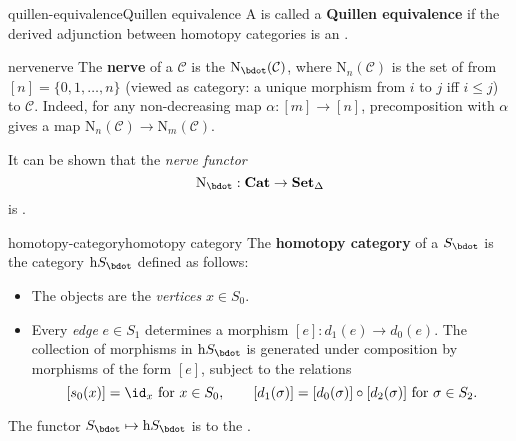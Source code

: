 \begin{topic}{quillen-equivalence}{Quillen equivalence}
    A  is called a \textbf{Quillen equivalence} if the derived adjunction between homotopy categories is an .
\end{topic}



  


\begin{topic}{nerve}{nerve}
    The \textbf{nerve} of a  $\mathcal{C}$ is the  $\text{N}_\bdot(\mathcal{C})$, where $\text{N}_n(\mathcal{C})$ is the set of  from $[n] = \{ 0, 1, \ldots, n \}$ (viewed as category: a unique morphism from $i$ to $j$ iff $i \le j$) to $\mathcal{C}$.
    Indeed, for any non-decreasing map $\alpha : [m] \to [n]$, precomposition with $\alpha$ gives a map $\text{N}_n(\mathcal{C}) \to \text{N}_m(\mathcal{C})$.
    
    It can be shown that the \textit{nerve functor}
    \[ \text{N}_\bdot : \textbf{Cat} \to \textbf{Set}_\Delta \]
    is  .
\end{topic}

\begin{topic}{homotopy-category}{homotopy category}
    The \textbf{homotopy category} of a  $S_\bdot$ is the category $\text{h}S_\bdot$ defined as follows:
    \begin{itemize}
        \item The objects are the \textit{vertices} $x \in S_0$.
        \item Every \textit{edge} $e \in S_1$ determines a morphism $[e] : d_1(e) \to d_0(e)$. The collection of morphisms in $\text{h}S_\bdot$ is generated under composition by morphisms of the form $[e]$, subject to the relations
        \[ [s_0(x)] = \id_x \text{ for } x \in S_0, \qquad [d_1(\sigma)] = [d_0(\sigma)] \circ [d_2(\sigma)] \text{ for } \sigma \in S_2 . \]
    \end{itemize}
    
    The functor $S_\bdot \mapsto \text{h}S_\bdot$ is  to the .
\end{topic}

